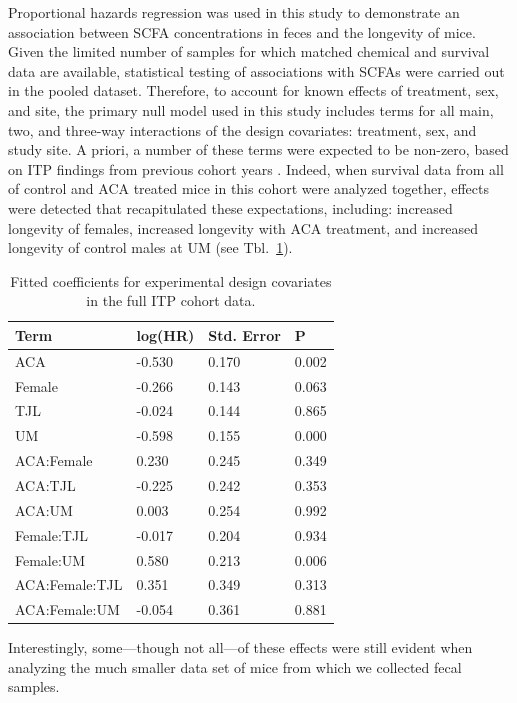 \documentclass{doc/template/bmcart-nofigbox}
\begin{document}
Proportional hazards regression was used in this study to demonstrate an
association between SCFA concentrations in feces and the longevity of mice.
Given the limited number of samples for which matched chemical and survival
data are available, statistical testing of associations with SCFAs were
carried out in the pooled dataset.
Therefore, to account for known effects of treatment, sex, and site, the
primary null model used in this study includes terms for all main, two, and
three-way interactions of the design covariates: treatment, sex, and study
site.
A priori, a number of these terms were expected to be non-zero, based on
ITP findings from previous cohort years \cite{Harrison2014, Strong2016}.
Indeed, when survival data from all of control and ACA treated mice
in this cohort were analyzed together,
effects were detected that recapitulated these expectations, including:
increased longevity of females, increased longevity with ACA treatment,
and increased longevity of control males at UM (see Tbl.~\ref{tbl:phreg_null_all}).

\begin{table}[h]
\caption{\label{tbl:phreg_null_all}Fitted coefficients for experimental design covariates in the full ITP cohort data.}
  \begin{tabular}{llll}
    \hline
    Term & log(HR) & Std. Error & P \\
    \hline
    ACA & -0.530 & 0.170 & 0.002 \\
    Female & -0.266 & 0.143 & 0.063 \\
    TJL & -0.024 & 0.144 & 0.865 \\
    UM & -0.598 & 0.155 & 0.000 \\
    ACA:Female & 0.230 & 0.245 & 0.349 \\
    ACA:TJL & -0.225 & 0.242 & 0.353 \\
    ACA:UM & 0.003 & 0.254 & 0.992 \\
    Female:TJL & -0.017 & 0.204 & 0.934 \\
    Female:UM & 0.580 & 0.213 & 0.006 \\
    ACA:Female:TJL & 0.351 & 0.349 & 0.313 \\
    ACA:Female:UM & -0.054 & 0.361 & 0.881 \\
    \hline
  \end{tabular}
\end{table}

Interestingly, some---though not all---of these effects were still
evident when analyzing the much smaller data set of mice from which we
collected fecal samples.
\end{document}
